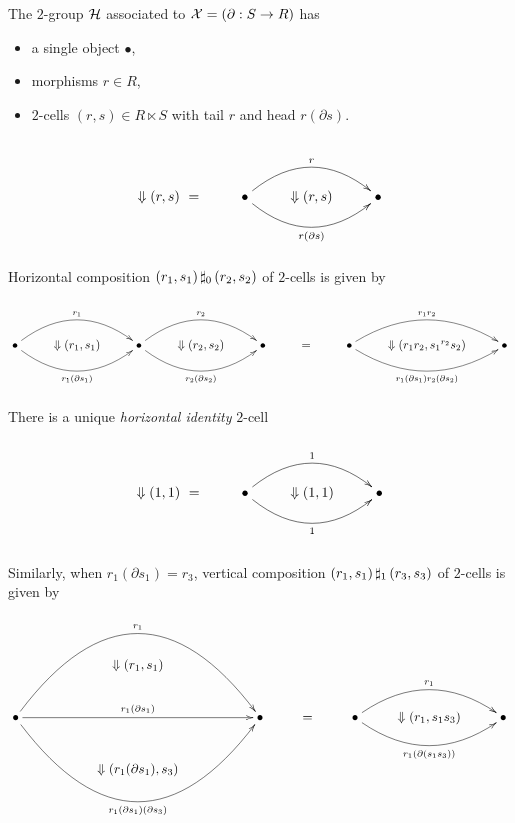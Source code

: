 The $2$-group $\mathcal{H}$ associated to $\mathcal{X} = (\partial : S \to R)$ has
\begin{itemize}
\item  a single object $\bullet$,
\item  morphisms $r \in R$,
\item  $2$-cells $(r,s) \in R \ltimes S$
       with tail $r$ and head $r(\partial s)$.
\end{itemize}
$$
\xy
\xymatrix{
   & & & \\
 \Downarrow (r,s)~= 
   & \bullet  \ar@/^5ex/[rr]^{r} 
              \ar@/_5ex/[rr]_{r(\partial s)} 
     & \Downarrow (r,s)
        & \bullet \\
   & & & \\
}
\endxy
$$

\noindent
Horizontal composition $(r_1,s_1) \,\sharp_0\, (r_2,s_2)$ 
of $2$-cells is given by
$$
\xy
\xymatrix{
  & &  & & & & & & \\
  \bullet \ar@/^5ex/[rr]^{r_1} 
          \ar@/_5ex/[rr]_{r_1(\partial s_1)} 
  & \Downarrow (r_1,s_1)
    & \bullet \ar@/^5ex/[rr]^{r_2} 
              \ar@/_5ex/[rr]_{r_2(\partial s_2)} 
      & \Downarrow (r_2,s_2)
        & \bullet 
          & = 
            & \bullet \ar@/^5ex/[rr]^{r_1r_2} 
                      \ar@/_5ex/[rr]_{r_1(\partial s_1)r_2(\partial s_2)} 
              & \Downarrow (r_1r_2,{s_1}^{r_2}{s_2})
                & \bullet \\
  & & & & & & & & \\
}
\endxy
$$

\noindent
There is a unique \emph{horizontal identity} $2$-cell
$$
\xy
\xymatrix{
   & & & \\
 \Downarrow(1,1)~=
   & \bullet  \ar@/^5ex/[rr]^{1} 
             \ar@/_5ex/[rr]_{1} 
     & \Downarrow (1,1)
        & \bullet \\
   & & & \\
}
\endxy
$$

\noindent
Similarly, when $r_1(\partial s_1) = r_3$,
vertical composition $(r_1,s_1) \,\sharp_1\, (r_3,s_3)$ 
of $2$-cells is given by
$$
\xy
\xymatrix{
  && && & & && \\
  && \Downarrow (r_1,s_1)
     && & & && \\
  \bullet \ar@/^15ex/[rrrr]^{r_1} 
          \ar[rrrr]^{r_1(\partial s_1)}
          \ar@/_15ex/[rrrr]_{r_1(\partial s_1)(\partial s_3)} 
  && && \bullet 
        &=& \bullet \ar@/^5ex/[rr]^{r_1} 
                    \ar@/_5ex/[rr]_{r_1(\partial(s_1s_3))} 
            & \Downarrow (r_1,s_1s_3)
             & \bullet \\
  && \Downarrow (r_1(\partial s_1),s_3)
     && & & && \\
  && && & & && \\
}
\endxy
$$

